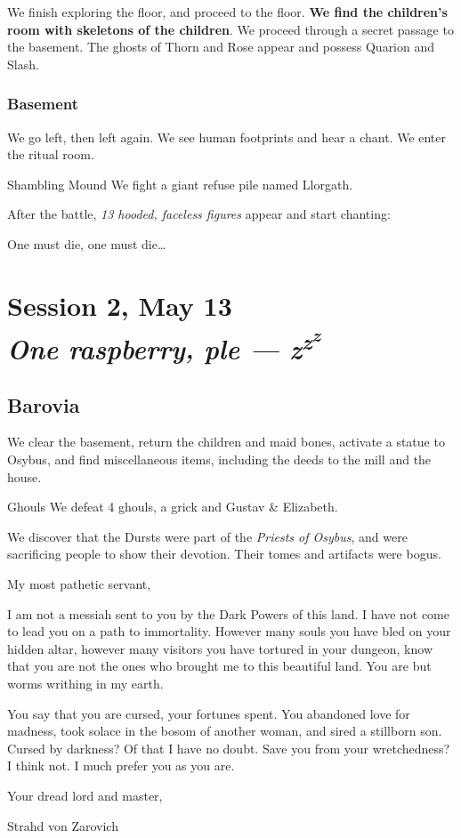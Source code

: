\documentclass[10pt,twoside,twocolumn]{article}
\begin{document}
We finish exploring the  floor, and proceed to the  floor. \textbf{We
find the children's room with skeletons of the children}. We proceed through
a secret passage to the basement. The ghosts of Thorn and Rose appear
and possess Quarion and Slash.

\subsubsection{Basement}
We go left, then left again. We see human footprints and hear a
chant. We enter the ritual room.

\begin{monsterbox}{Shambling Mound}
  We fight a giant refuse pile named Llorgath.
\end{monsterbox}

After the battle, \emph{13 hooded, faceless figures} appear and start chanting:
\begin{quotebox}
  One must die, one must die\ldots
\end{quotebox}
\clearpage
\section{Session 2, May 13\\\textit{One raspberry, ple --- z\textsuperscript{z\textsuperscript{z}}}}
\subsection{Barovia}

We clear the basement, return the children and maid bones, activate a
statue to Osybus, and find miscellaneous items, including the deeds to
the mill and the house.

\begin{monsterbox}{Ghouls}
  We defeat 4 ghouls, a grick and Gustav \& Elizabeth.
\end{monsterbox}

We discover that the Dursts were part of the \emph{Priests of Osybus}, and were sacrificing people to show their devotion. Their tomes and artifacts were bogus.

\begin{quotebox}
  {\calligra
  My most pathetic servant,
  
  I am not a messiah sent to you by the Dark Powers of this land. I
  have not come to lead you on a path to immortality. However many
  souls you have bled on your hidden altar, however many visitors you
  have tortured in your dungeon, know that you are not the ones who
  brought me to this beautiful land. You are but worms writhing in my
  earth.

  You say that you are cursed, your fortunes spent. You abandoned love
  for madness, took solace in the bosom of another woman, and sired a
  stillborn son. Cursed by darkness? Of that I have no doubt. Save you
  from your wretchedness? I think not. I much prefer you as you are.

  Your dread lord and master,

  Strahd von Zarovich}
\end{quotebox}
\end{document}
